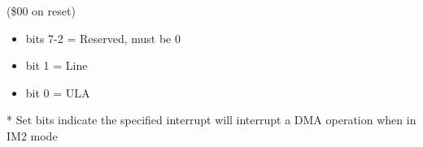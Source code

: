 (\$00 on reset)
\begin{itemize}
\item bits 7-2 = Reserved, must be 0
\item bit 1 = Line
\item bit 0 = ULA
\end{itemize}
* Set bits indicate the specified interrupt will interrupt a DMA
  operation when in IM2 mode

